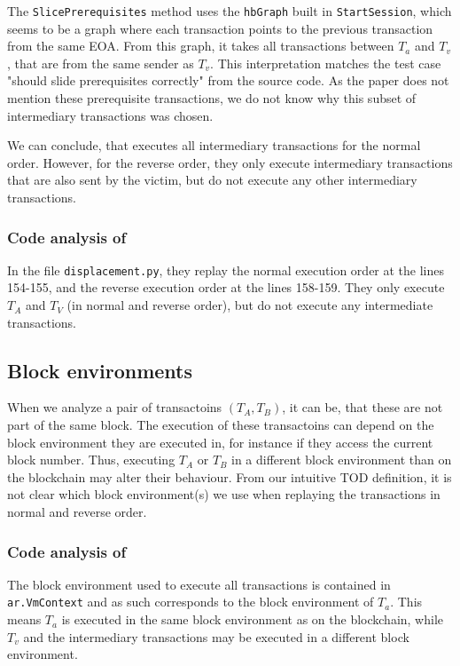 \documentclass[draft,final]{vutinfth} %
\begin{document}
The \verb|SlicePrerequisites| method uses the \verb|hbGraph| built in \verb|StartSession|, which seems to be a graph where each transaction points to the previous transaction from the same EOA. From this graph, it takes all transactions between $T_a$ and $T_v$, that are from the same sender as $T_v$. This interpretation matches the test case "should slide prerequisites correctly" from the source code. As the paper does not mention these prerequisite transactions, we do not know why this subset of intermediary transactions was chosen.

We can conclude, that \cite{zhang_combatting_2023} executes all intermediary transactions for the normal order. However, for the reverse order, they only execute intermediary transactions that are also sent by the victim, but do not execute any other intermediary transactions.

\subsubsection{Code analysis of \cite{torres_frontrunner_2021}}

In the file \verb|displacement.py|, they replay the normal execution order at the lines 154-155, and the reverse execution order at the lines 158-159. They only execute $T_A$ and $T_V$ (in normal and reverse order), but do not execute any intermediate transactions.

\subsection{Block environments}

When we analyze a pair of transactoins $(T_A, T_B)$, it can be, that these are not part of the same block. The execution of these transactoins can depend on the block environment they are executed in, for instance if they access the current block number. Thus, executing $T_A$ or $T_B$ in a different block environment than on the blockchain may alter their behaviour. From our intuitive TOD definition, it is not clear which block environment(s) we use when replaying the transactions in normal and reverse order.

\subsubsection{Code analysis of \cite{zhang_combatting_2023}}

The block environment used to execute all transactions is contained in \verb|ar.VmContext| and as such corresponds to the block environment of $T_a$. This means $T_a$ is executed in the same block environment as on the blockchain, while $T_v$ and the intermediary transactions may be executed in a different block environment.
\end{document}
